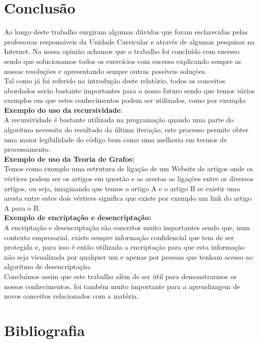 \documentclass[12pt]{article}
\begin{document}
    \section{Conclusão}
    \noindent Ao longo deste trabalho surgiram algumas dúvidas que foram esclarecidas pelas professoras responsáveis da Unidade Curricular e através de algumas pesquisas na Internet. Na nossa opinião achamos que o trabalho foi concluído com sucesso sendo que solucionamos todos os exercícios com sucesso explicando sempre as nossas resoluções e apresentando sempre outras possíveis soluções.\\
    
    \noindent Tal como já foi referido na introdução deste relatório, todos os conceitos abordados serão bastante importantes para o nosso futuro sendo que temos vários exemplos em que estes conhecimentos podem ser utilizados, como por exemplo:\\
    
    \noindent \textbf{Exemplo do uso da recursividade}:\\
    A recursividade é bastante utilizada na programação quando uma parte do algoritmo necessita do resultado da última iteração, este processo permite obter uma maior legibilidade do código bem como uma melhoria em termos de processamento.\\
    
    \noindent\textbf{Exemplo de uso da Teoria de Grafos:}\\
    Temos como exemplo uma estrutura de ligação de um Website de artigos onde os vértices podem ser os artigos em questão e as arestas as ligações entre os diversos artigos, ou seja, imaginando que temos o artigo A e o artigo B se existir uma aresta entre estes dois vértices significa que existe por exemplo um link do artigo A para o B.\\
    
    \noindent\textbf{Exemplo de encriptação e desencriptação:}\\
    A encriptação e desencriptação são conceitos muito importantes sendo que, num contexto empresarial, existe sempre informação confidencial que tem de ser protegida e, para isso é então utilizada a encriptação para que esta informação não seja visualizada por qualquer um e apenas por pessoas que tenham acesso ao algoritmo de desencriptação.\\

    \noindent Concluímos assim que este trabalho além de ser útil para demonstrarmos os nossos conhecimentos, foi também muito importante para a aprendizagem de novos conceitos relacionados com a matéria.


    \newpage
    
    \section{Bibliografia}
    \nocite{ euclid, grafos, inducao, EGV, scilab, graphtea, overleaf, rota, tablesgenerator, waze, dijkstra}
    \printbibliography[heading=none]
\end{document}
